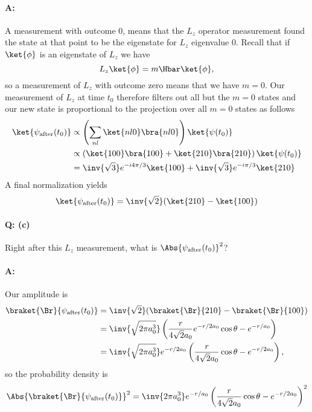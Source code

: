 {\paragraph{A:}
%
A measurement with outcome 0, means that the \(L_z\) operator measurement found the state at that point to be the eigenstate for \(L_z\) eigenvalue 0.  Recall that  if \(\ket{\phi}\) is an eigenstate of \(L_z\) we have
%
\begin{equation}\label{eqn:qmIexamPractice2007Dec:4:200}
L_z \ket{\phi} = m \Hbar \ket{\phi},
\end{equation}
%
so a measurement of \(L_z\) with outcome zero means that we have \(m=0\).  Our measurement of \(L_z\) at time \(t_0\) therefore filters out all but the \(m=0\) states and our new state is proportional to the projection over all \(m=0\) states as follows
%
\begin{equation}\label{eqn:qmIexamPractice2007Dec:510}
\begin{aligned}
\ket{\psi_{\text{after}}(t_0)}
&\propto \left( \sum_{n l} \ket{n l 0}\bra{n l 0} \right) \ket{\psi(t_0)}  \\
&\propto \left(
\ket{1 0 0}\bra{1 0 0}
+\ket{2 1 0}\bra{2 1 0}
\right) \ket{\psi(t_0)}  \\
&=
\inv{\sqrt{3}} e^{-i 4 \pi / 3} \ket{100}
+\inv{\sqrt{3}} e^{- i \pi / 3 } \ket{210}
\end{aligned}
\end{equation}
%
A final normalization yields
\begin{equation}\label{eqn:qmIexamPractice2007Dec:4:210}
\ket{\psi_{\text{after}}(t_0)}
= \inv{\sqrt{2}} (\ket{210} - \ket{100})
\end{equation}
%
\paragraph{Q: (c)}
%
Right after this \(L_z\) measurement, what is \(\Abs{\psi_{\text{after}}(t_0)}^2\)?
%
\paragraph{A:}
%
Our amplitude is
%
\begin{equation}\label{eqn:qmIexamPractice2007Dec:530}
\begin{aligned}
\braket{\Br}{\psi_{\text{after}}(t_0)}
&= \inv{\sqrt{2}} (\braket{\Br}{210} - \braket{\Br}{100}) \\
&= \inv{\sqrt{2 \pi a_0^3}}
\left(
\frac{r}{4\sqrt{2} a_0} e^{-r/2a_0} \cos\theta
-e^{-r/a_0}
\right) \\
&= \inv{\sqrt{2 \pi a_0^3}}
e^{-r/2 a_0}
\left(
\frac{r}{4\sqrt{2} a_0} \cos\theta
-e^{-r/2 a_0}
\right),
\end{aligned}
\end{equation}
%
so the probability density is
\begin{equation}\label{eqn:qmIexamPractice2007Dec:4:300}
\Abs{\braket{\Br}{\psi_{\text{after}}(t_0)}}^2
= \inv{2 \pi a_0^3}
e^{-r/a_0}
\left(
\frac{r}{4\sqrt{2} a_0} \cos\theta
-e^{-r/2 a_0}
\right)^2
\end{equation}
%
}
